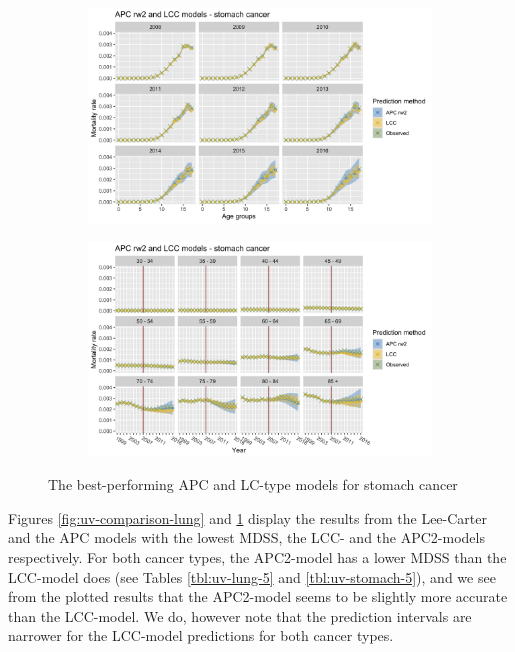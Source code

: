 \begin{figure}[h!]
    \centering
    \begin{subfigure}[b]{.45\linewidth}
        \includegraphics[width=\linewidth]{real-data/real-data-univariate/Figures/univariate-comparison-by-age-stomach.png}
    \end{subfigure}
    \begin{subfigure}[b]{.45\linewidth}
        \includegraphics[width=\linewidth]{real-data/real-data-univariate/Figures/univariate-comparison-by-period-stomach.png}
    \end{subfigure}
    \caption{The best-performing APC and LC-type models for stomach cancer}
    \label{fig:uv-comparison-stomach}
\end{figure}

Figures \ref{fig:uv-comparison-lung} and \ref{fig:uv-comparison-stomach} display the results from the Lee-Carter and the APC models with the lowest MDSS, the LCC- and the APC2-models respectively. For both cancer types, the APC2-model has a lower MDSS than the LCC-model does (see Tables \ref{tbl:uv-lung-5} and \ref{tbl:uv-stomach-5}), and we see from the plotted results that the APC2-model seems to be slightly more accurate than the LCC-model. We do, however note that the prediction intervals are narrower for the LCC-model predictions for both cancer types.

